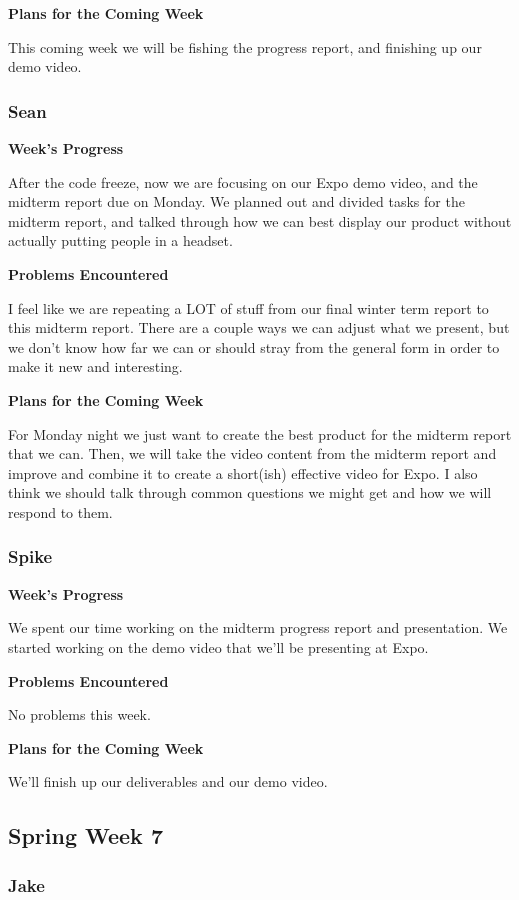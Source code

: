 \documentclass[10pt,journal,compsoc,onecolumn, draftclsnofoot]{IEEEtran}
\begin{document}
\noindent \textbf{Plans for the Coming Week}

This coming week we will be fishing the progress report, and finishing up our demo video.

\subsubsection{Sean}
\noindent \textbf{Week's Progress}

After the code freeze, now we are focusing on our Expo demo video, and the midterm report due on Monday. We planned out and divided tasks for the midterm report, and talked through how we can best display our product without actually putting people in a headset.

\noindent \textbf{Problems Encountered}

I feel like we are repeating a LOT of stuff from our final winter term report to this midterm report. There are a couple ways we can adjust what we present, but we don't know how far we can or should stray from the general form in order to make it new and interesting.

\noindent \textbf{Plans for the Coming Week}

For Monday night we just want to create the best product for the midterm report that we can. Then, we will take the video content from the midterm report and improve and combine it to create a short(ish) effective video for Expo. I also think we should talk through common questions we might get and how we will respond to them.

\subsubsection{Spike}
\noindent \textbf{Week's Progress}

We spent our time working on the midterm progress report and presentation. We started working on the demo video that we'll be presenting at Expo.

\noindent \textbf{Problems Encountered}

No problems this week.

\noindent \textbf{Plans for the Coming Week}

We'll finish up our deliverables and our demo video.

\subsection{Spring Week 7}
\subsubsection{Jake}
\end{document}
